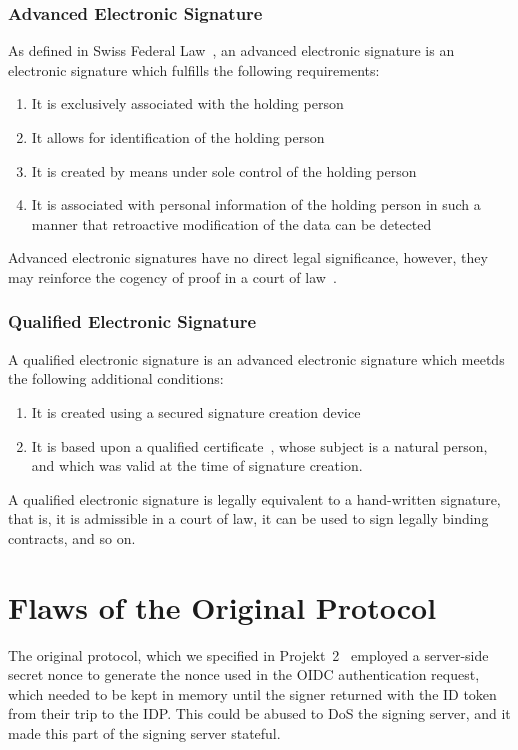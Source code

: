 \subsubsection{Advanced Electronic Signature}
As defined in Swiss Federal Law~\cite[Art. 2]{zertes},
an advanced electronic signature is an electronic signature which fulfills the following requirements:

\begin{enumerate}
    \item It is exclusively associated with the holding person
    \item It allows for identification of the holding person
    \item It is created by means under sole control of the holding person
    \item It is associated with personal information of the holding person in such a manner that retroactive modification of the data can be detected
\end{enumerate}

Advanced electronic signatures have no direct legal significance, however,
they may reinforce the cogency of proof in a court of law~\cite[4.19]{crypto-folien-hassenstein}.

\subsubsection{Qualified Electronic Signature}
A qualified electronic signature is an advanced electronic signature which meetds the following additional conditions:
\begin{enumerate}
    \item It is created using a secured signature creation device~\cite[Art. 6]{zertes}
    \item It is based upon a qualified certificate~\cite[Art. 7 and 8]{zertes}, whose subject is a natural person,
    and which was valid at the time of signature creation.
\end{enumerate}

A qualified electronic signature is legally equivalent to a hand-written signature, that is,
it is admissible in a court of law, it can be used to sign legally binding contracts, and so on.


\section{Flaws of the Original Protocol}\label{sec:flaws-of-the-original-protocol}
The original protocol, which we specified in Projekt~2~\cite{projekt2} employed a server-side secret nonce to generate the nonce used in the \gls{OIDC} authentication request,
which needed to be kept in memory until the signer returned with the ID token from their trip to the \gls{IDP}.
This could be abused to \gls{DoS} the signing server, and it made this part of the signing server stateful.

